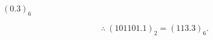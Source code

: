 \begin{minipage}{\linewidth}
\begin{minipage}[t]{.48\linewidth}
$ (0.3)_{6} $
\end{minipage}\par
\[\therefore\ (101101.1)_{2}=(113.3)_{6}.\]
\end{minipage}\par
